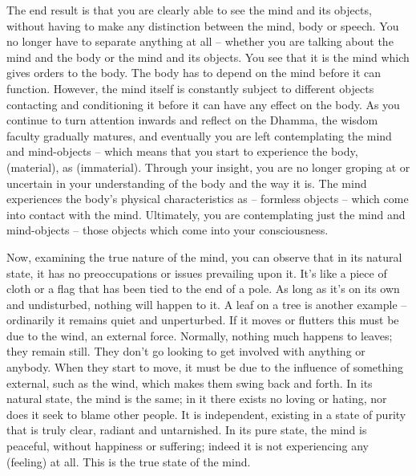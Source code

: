 The end result is that you are clearly able to see the mind and its objects, without having to make any distinction between the mind, body or speech. You no longer have to separate anything at all -- whether you are talking about the mind and the body or the mind and its objects. You see that it is the mind which gives orders to the body. The body has to depend on the mind before it can function. However, the mind itself is constantly subject to different objects contacting and conditioning it before it can have any effect on the body. As you continue to turn attention inwards and reflect on the Dhamma, the wisdom faculty gradually matures, and eventually you are left contemplating the mind and mind-objects -- which means that you start to experience the body,  (material), as  (immaterial). Through your insight, you are no longer groping at or uncertain in your understanding of the body and the way it is. The mind experiences the body's physical characteristics as  -- formless objects -- which come into contact with the mind. Ultimately, you are contemplating just the mind and mind-objects -- those objects which come into your consciousness.

Now, examining the true nature of the mind, you can observe that in its natural state, it has no preoccupations or issues prevailing upon it. It's like a piece of cloth or a flag that has been tied to the end of a pole. As long as it's on its own and undisturbed, nothing will happen to it. A leaf on a tree is another example -- ordinarily it remains quiet and unperturbed. If it moves or flutters this must be due to the wind, an external force. Normally, nothing much happens to leaves; they remain still. They don't go looking to get involved with anything or anybody. When they start to move, it must be due to the influence of something external, such as the wind, which makes them swing back and forth. In its natural state, the mind is the same; in it there exists no loving or hating, nor does it seek to blame other people. It is independent, existing in a state of purity that is truly clear, radiant and untarnished. In its pure state, the mind is peaceful, without happiness or suffering; indeed it is not experiencing any  (feeling) at all. This is the true state of the mind.

